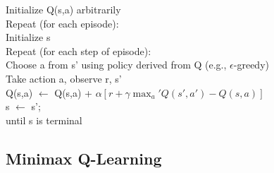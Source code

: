 \documentclass{article}
\newcommand{\tab}{\hspace{10mm}}
\newcommand{\dtab}{\hspace{20mm}}
\begin{document}
\begin{center} 
\begin{mdframed}
\begin{algorithm}[H]
Initialize Q(s,a) arbitrarily \\
Repeat (for each episode):\\
\tab Initialize s \\
\tab Repeat (for each step of episode):\\
\dtab Choose a from s' using policy derived from Q (e.g., $\epsilon$-greedy)\\
\dtab Take action a, observe r, s'\\
\dtab Q(s,a) $\leftarrow$ Q(s,a) + $\alpha [ r + \gamma \max_a' Q(s', a') - Q(s, a) ]$  \\
\dtab s $\leftarrow$ s'; \\
\tab until s is terminal\\
\end{algorithm}
\end{mdframed}
\label{alg:qlearning}
\end{center}





\subsection{Minimax Q-Learning} 




\begin{comment}
Initialize:
For all s in S, a in A, and o in O,
Let Q[s,a,o] := 1
For all s in S,
Let V[s] := 1
For all s in S, a in A,
Let pi[s,a] := 1/|A|
Let alpha := 1.0
Choose an action:
With probability explor, return an action uniformly at random.
Otherwise, if current state is s,
Return action a with probability pi[s,a].
Learn:
After receiving reward rew for moving from state s to s’
via action a and opponent’s action o,
Let Q[s,a,o] := (1-alpha) * Q[s,a,o] + alpha * (rew + gamma * V[s’])
Use linear programming to find pi[s,.] such that:
pi[s,.] := argmaxfpi’[s,.], minfo’, sumfa’, pi[s,a’] * Q[s,a’,o’]ggg
Let V[s] := minfo’, sumfa’, pi[s,a’] * Q[s,a’,o’]gg
Let alpha := alpha * decay
\end{comment}


%
\end{document}
